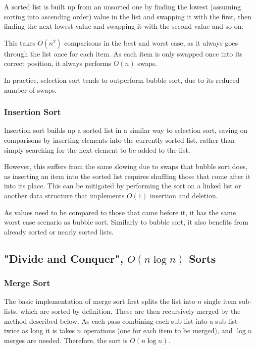 \documentclass[]{article}
\begin{document}
A sorted list is built up from an unsorted one by finding the lowest (assuming sorting into ascending order) value in the list and swapping it with the first, then finding the next lowest value and swapping it with the second value and so on.

This takes $O(n^2)$ comparisons in the best and worst case, as it always goes through the list once for each item. As each item is only swapped once into its correct position, it always performs $O(n)$ swaps.

In practice, selection sort tends to outperform bubble sort, due to its reduced number of swaps.

\subsubsection{Insertion Sort}

Insertion sort builds up a sorted list in a similar way to selection sort, saving on comparisons by inserting elements into the currently sorted list, rather than simply searching for the next element to be added to the list.

However, this suffers from the same slowing due to swaps that bubble sort does, as inserting an item into the sorted list requires shuffling those that come after it into its place. This can be mitigated by performing the sort on a linked list or another data structure that implements $O(1)$ insertion and deletion.

As values need to be compared to those that came before it, it has the same worst case scenario as bubble sort. Similarly to bubble sort, it also benefits from already sorted or nearly sorted lists.

\pagebreak

\subsection{"Divide and Conquer", $O(n\log{n})$ Sorts}

\subsubsection{Merge Sort}

The basic implementation of merge sort first splits the list into $n$ single item sub-lists, which are sorted by definition. These are then recursively merged by the method described below. As each pass combining each sub-list into a sub-list twice as long it is takes $n$ operations (one for each item to be merged), and $\log{n}$ merges are needed. Therefore, the sort is $O(n\log{n}) $.
\end{document}
